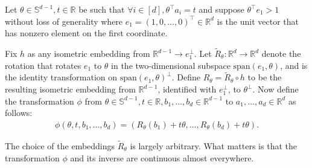 \documentclass{theoretics}
\newcommand{\R}{\mathbb R}
\newcommand{\T}{\top}
\begin{document}
\begin{definition}\label{def:change-of-variables}
    Let $\theta\in \mathbb{S}^{d-1}, t\in \R$
    be such that $\forall i\in [d], \theta^\top a_i = t$ and suppose $\theta^\T e_1 > 1$ without loss of generality where $e_1 = (1, 0, \ldots, 0)^\top \in \R^d$ is the unit vector that has nonzero element on the first coordinate.
    
    Fix $h$ as any isometric embedding from $\R^{d-1} \to e_1^\perp$.
    Let $\tilde{R}_{\theta}: \R^d \to \R^d$ denote the rotation
    that rotates $e_1$ to $\theta$ in the two-dimensional subspace
    $\mathrm{span}(e_1, \theta)$, and is the identity transformation on $\mathrm{span}(e_1, \theta)^\perp$.
    Define $R_{\theta} = \tilde{R}_{\theta} \circ h$ to be the resulting
    isometric embedding from $\R^{d-1}$, identified with $e_1^\perp$, to $\theta^\perp$.
    Now define the transformation $\phi$ from $\theta\in \mathbb{S}^{d-1}, t \in \R, b_1,\ldots,b_d\in \R^{d-1}$ to $a_1,\ldots, a_d \in \R^d$ as follows:
    \begin{align}\label{eq:change-of-variables}
        \phi(\theta, t, b_1,\ldots,b_d) = (R_{\theta}(b_1) + t\theta, \ldots, R_{\theta}(b_d) + t\theta).%
    \end{align}
\end{definition}

The choice of the embeddings $\tilde R_\theta$ is largely arbitrary.
What matters is that the transformation $\phi$ and its inverse are continuous almost everywhere.
\end{document}
